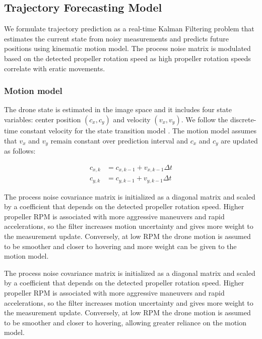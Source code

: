 \documentclass[letterpaper, 10 pt, conference]{ieeeconf}  %
\begin{document}

\subsection{Trajectory Forecasting Model}\label{subsec:traj_forecast_model}
We formulate trajectory prediction as a real-time Kalman Filtering problem that estimates the current state from noisy measurements and predicts future positions using kinematic motion model. The process noise matrix is modulated based on the detected propeller rotation speed as high propeller rotation speeds correlate with eratic movements.  



\subsubsection{Motion model}
The drone state is estimated in the image space and it includes four state variables:
center position $(c_x, c_y)$ and velocity $(v_x, v_y)$. 
We follow the discrete-time constant velocity for the state transition model \cite{montanez2023application, lizzio2023comparison}. The motion model assumes that $v_x$ and $v_y$ remain constant over prediction interval and $c_x$ and $c_y$ are updated as follows: 

\begin{align*}
    c_{x,k} &= c_{x,k-1} + v_{x,k-1} \Delta t \\
    c_{y,k} &= c_{y,k-1} + v_{y,k-1} \Delta t 
\end{align*}

The process noise covariance matrix is initialized as a diagonal matrix and scaled by a coefficient that depends on the detected propeller rotation speed. Higher propeller RPM is associated with more aggressive maneuvers and rapid accelerations, so the filter increases motion uncertainty and gives more weight to the measurement update.
Conversely, at low RPM the drone motion is assumed to be smoother and closer to hovering and more weight can be given to the motion model. 

The process noise covariance matrix is initialized as a diagonal matrix and
scaled by a coefficient that depends on the detected propeller rotation speed.
Higher propeller RPM is associated with more aggressive maneuvers and rapid
accelerations, so the filter increases motion uncertainty and gives more weight
to the measurement update. Conversely, at low RPM the drone motion is assumed
to be smoother and closer to hovering, allowing greater reliance on the motion model.
\end{document}
